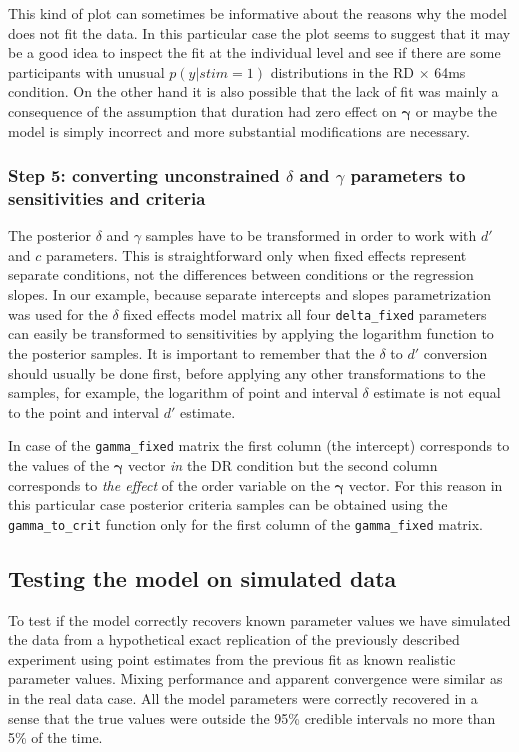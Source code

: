 \documentclass[oneside,a4paper]{article}
\begin{document}
This kind of plot can sometimes be informative about the reasons why
the model does not fit the data. In this particular case the plot
seems to suggest that it may be a good idea to inspect the fit at the
individual level and see if there are some participants with unusual
$p(y|stim=1)$ distributions in the RD $\times$ 64ms condition. On the
other hand it is also possible that the lack of fit was mainly a
consequence of the assumption that duration had zero effect on
$\bm{\gamma}$ or maybe the model is simply incorrect and more
substantial modifications are necessary.

\subsubsection{Step 5: converting unconstrained $\delta$ and $\gamma$
  parameters to sensitivities and criteria}

The posterior $\delta$ and $\gamma$ samples have to be transformed in
order to work with $d'$ and $c$ parameters. This is straightforward
only when fixed effects represent separate conditions, not the
differences between conditions or the regression slopes. In our
example, because separate intercepts and slopes parametrization was
used for the $\delta$ fixed effects model matrix all four
\texttt{delta\_fixed} parameters can easily be transformed to
sensitivities by applying the logarithm function to the posterior
samples. It is important to remember that the $\delta$ to $d'$
conversion should usually be done first, before applying any other
transformations to the samples, for example, the logarithm of point
and interval $\delta$ estimate is not equal to the point and interval
$d'$ estimate.

In case of the \texttt{gamma\_fixed} matrix the first column (the
intercept) corresponds to the values of the $\bm{\gamma}$ vector
\emph{in} the DR condition but the second column corresponds to
\emph{the effect} of the order variable on the $\bm{\gamma}$
vector. For this reason in this particular case posterior criteria
samples can be obtained using the \texttt{gamma\_to\_crit} function
only for the first column of the \texttt{gamma\_fixed} matrix.

\subsection{Testing the model on simulated data}

To test if the model correctly recovers known parameter values we have
simulated the data from a hypothetical exact replication of the
previously described experiment using point estimates from the
previous fit as known realistic parameter values. Mixing performance
and apparent convergence were similar as in the real data case. All
the model parameters were correctly recovered in a sense that the true
values were outside the 95\% credible intervals no more than 5\% of
the time.
\end{document}
